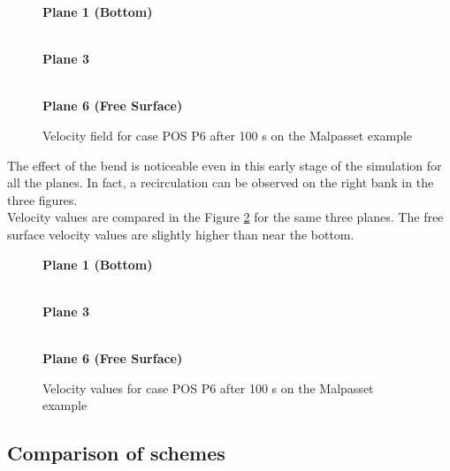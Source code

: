 \begin{figure}[H]
  \centering
  \textbf{Plane 1 (Bottom)}\par\medskip
  \\
  \textbf{Plane 3}\par\medskip
  \\
  \textbf{Plane 6 (Free Surface)}\par\medskip
  \caption{Velocity field for case POS P6 after 100 s on the Malpasset example}\label{fig:malpasset:velocityFieldMURD}
\end{figure}

The effect of the bend is noticeable even in this early stage of the simulation for all the planes.
In fact, a recirculation can be observed on the right bank in the three figures. \\

Velocity values are compared in the Figure \ref{fig:malpasset:velocityMap} for the same three planes. The free surface velocity values are slightly higher than near the bottom.

\begin{figure}[H]
  \centering
  \hspace{-1.cm}\textbf{Plane 1 (Bottom)}\par\medskip
  \\
  \hspace{-1.cm}\textbf{Plane 3}\par\medskip
  \\
  \hspace{-1.cm}\textbf{Plane 6 (Free Surface)}\par\medskip
  \caption{Velocity values for case POS P6 after 100 s on the Malpasset example}\label{fig:malpasset:velocityMap}
\end{figure}

\subsection{Comparison of schemes}
